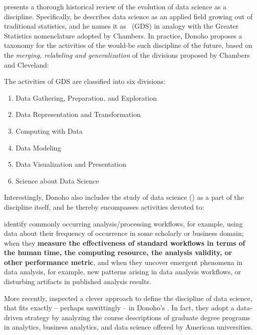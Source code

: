  presents a thorough historical review of the evolution of data science as a discipline.
Specifically, he describes data science as an applied field growing out of traditional statistics, and he names it as \mbox{ (GDS)} in analogy with the Greater Statistics nomenclature adopted by Chambers.
In practice, Donoho proposes a taxonomy for the activities of the would-be such discipline of the future, based on the \textit{merging, relabeling and generalization} of the divisions proposed by Chambers and Cleveland:
\begin{displayquote}
The activities of GDS are classified into six divisions:
\begin{enumerate}
    \item Data Gathering, Preparation, and Exploration\itemsep=1mm
    \item Data Representation and Transformation
    \item Computing with Data
    \item Data Modeling
    \item Data Visualization and Presentation
    \item Science about Data Science \label{gds6}
\end{enumerate}
\end{displayquote}
Interestingly, Donoho also includes the study of data science (\gdsSix) as a part of the discipline itself, and he thereby encompasses activities devoted to:
\begin{displayquote}
identify commonly occurring analysis/processing workflows, for example, using data about their frequency of occurrence in some scholarly or business domain; when they \textbf{measure the effectiveness of standard workflows in terms of the human time, the computing resource, the analysis validity, or other performance metric}, and when they uncover emergent phenomena in data analysis, for example, new patterns arising in data analysis workflows, or disturbing artifacts in published analysis results.
\end{displayquote}

More recently,  inspected a clever approach to define the discipline of data science, that fits exactly -- perhaps unwittingly -- in Donoho's \gdsSix. In fact, they adopt a data-driven strategy by analyzing the course descriptions of graduate degree programs in analytics, business  analytics,  and  data  science  offered  by  American universities.


